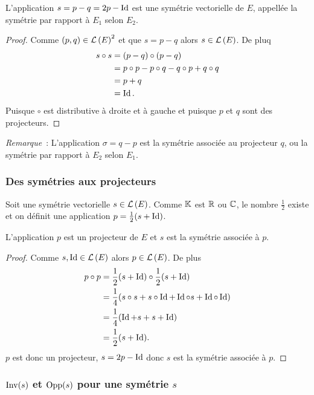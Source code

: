 \begin{prop}
  L'application \(s=p-q=2p-\operatorname{Id}\) est une symétrie vectorielle de \(E\), appellée la symétrie par rapport à \(E_1\) selon \(E_2\).
\end{prop}
\begin{proof}
  Comme \((p,q) \in \mathcal{L}\left(E\right)^2\) et que \(s=p-q\) alors \(s \in \mathcal{L}\left(E\right)\). De pluq
  \begin{align}
    s \circ s &=(p-q) \circ (p-q)\\
    &=p \circ p -p \circ q -q \circ p +q \circ q\\
    &=p+q\\
    &=\operatorname{Id}.
  \end{align}
  Puisque \(\circ\) est distributive à droite et à gauche et puisque \(p\) et \(q\) sont des projecteurs.
\end{proof}

\emph{Remarque}~: L'application \(\sigma=q-p\) est la symétrie associée au projecteur \(q\), ou la symétrie par rapport à \(E_2\) selon \(E_1\).

\subsubsection{Des symétries aux projecteurs}

Soit une symétrie vectorielle \(s \in \mathcal{L}\left(E\right)\). Comme \(\mathbb{K}\) est \(\mathbb{R}\) ou \(\mathbb{C}\), le nombre \(\frac{1}{2}\) existe et on définit une application \(p = \frac{1}{2}(s+\operatorname{Id})\).

\begin{prop}
  L'application \(p\) est un projecteur de \(E\) et \(s\) est la symétrie associée à \(p\).
\end{prop}
\begin{proof}
  Comme \(s, \operatorname{Id} \in \mathcal{L}\left(E\right)\) alors \(p \in \mathcal{L}\left(E\right)\). De plus
  \begin{align}
    p \circ p &= \frac{1}{2}(s+\operatorname{Id}) \circ \frac{1}{2}(s+\operatorname{Id}) \\
    &=\frac{1}{4}(s \circ s + s\circ \operatorname{Id} +\operatorname{Id} \circ s +\operatorname{Id} \circ \operatorname{Id})\\
    &=\frac{1}{4}(\operatorname{Id} +s +s+\operatorname{Id})\\
    &=\frac{1}{2}(s+\operatorname{Id}).
  \end{align}
\(p\) est donc un projecteur, \(s=2p-\operatorname{Id}\) donc \(s\) est la symétrie associée à \(p\).
\end{proof}

\subsubsection{\(\operatorname{Inv}(s)\) et \(\operatorname{Opp}(s)\) pour une symétrie \(s\)}

